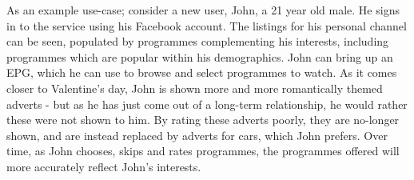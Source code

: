 As an example use-case; consider a new user, John, a 21 year old male. He signs in to the service using his Facebook account. The listings for his personal channel can be seen, populated by programmes complementing his interests, including programmes which are popular within his demographics. John can bring up an EPG, which he can use to browse and select programmes to watch. As it comes closer to Valentine’s day, John is shown more and more romantically themed adverts - but as he has just come out of a long-term relationship, he would rather these were not shown to him. By rating these adverts poorly, they are no-longer shown, and are instead replaced by adverts for cars, which John prefers.  Over time, as John chooses, skips and rates programmes, the programmes offered will more accurately reflect John’s interests. 

